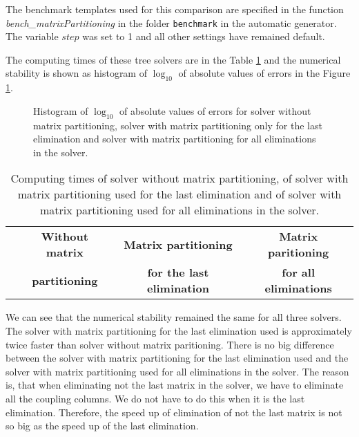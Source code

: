 The benchmark templates used for this comparison are specified in the function \textit{bench\_\-mat\-rix\-Partitioning} in the folder \texttt{benchmark} in the automatic generator. The variable $step$ was set to 1 and all other settings have remained default.

The computing times of these tree solvers are in the Table \ref{tab:part} and the numerical stability is shown as histogram of $\log_{10}$ of absolute values of errors in the Figure \ref{graph:part}.

\begin{figure}[ht]
  \centering
  \resizebox{0.95\textwidth}{!}{}
  \caption{Histogram of $\log_{10}$ of absolute values of errors for solver without matrix partitioning, solver with matrix partitioning only for the last elimination and solver with matrix partitioning for all eliminations in the solver.}
  \label{graph:part}
\end{figure}

\begin{table}[ht]
  \centering
  \begin{tabular}{|c||ccc|}
    \hline
      & \textbf{Without matrix} & \textbf{Matrix partitioning}      & \textbf{Matrix paritioning} \\
      & \textbf{partitioning}   & \textbf{for the last elimination} & \textbf{for all eliminations} \\
    \hline\hline
    
    \hline
  \end{tabular}
  \caption{Computing times of solver without matrix partitioning, of solver with matrix partitioning used for the last elimination and of solver with matrix partitioning used for all eliminations in the solver.}
  \label{tab:part}
\end{table}

We can see that the numerical stability remained the same for all three solvers. The solver with matrix partitioning for the last elimination used is approximately twice faster than solver without matrix paritioning. There is no big difference between the solver with matrix partitioning for the last elimination used and the solver with matrix partitioning used for all eliminations in the solver. The reason is, that when eliminating not the last matrix in the solver, we have to eliminate all the coupling columns. We do not have to do this when it is the last elimination. Therefore, the speed up of elimination of not the last matrix is not so big as the speed up of the last elimination.

